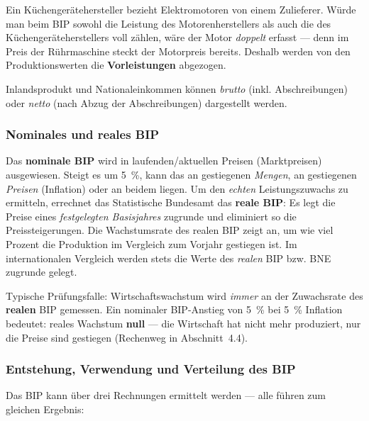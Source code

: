 \documentclass[11pt, a4paper]{article}
\begin{document}
\begin{beispiel}
Ein Küchengerätehersteller bezieht Elektromotoren von einem Zulieferer. Würde man beim
BIP sowohl die Leistung des Motorenherstellers als auch die des Küchengeräteherstellers
voll zählen, wäre der Motor \emph{doppelt} erfasst --- denn im Preis der Rührmaschine
steckt der Motorpreis bereits. Deshalb werden von den Produktionswerten die
\textbf{Vorleistungen} abgezogen.
\end{beispiel}

Inlandsprodukt und Nationaleinkommen können \emph{brutto} (inkl. Abschreibungen) oder
\emph{netto} (nach Abzug der Abschreibungen) dargestellt werden.

\subsubsection{Nominales und reales BIP}

Das \textbf{nominale BIP} wird in laufenden/aktuellen Preisen (Marktpreisen) ausgewiesen.
Steigt es um 5~\%, kann das an gestiegenen \emph{Mengen}, an gestiegenen \emph{Preisen}
(Inflation) oder an beidem liegen. Um den \emph{echten} Leistungszuwachs zu ermitteln,
errechnet das Statistische Bundesamt das \textbf{reale BIP}: Es legt die Preise eines
\emph{festgelegten Basisjahres} zugrunde und eliminiert so die Preissteigerungen. Die
Wachstumsrate des realen BIP zeigt an, um wie viel Prozent die Produktion im Vergleich
zum Vorjahr gestiegen ist. Im internationalen Vergleich werden stets die Werte des
\emph{realen} BIP bzw. BNE zugrunde gelegt.

\begin{achtung}
Typische Prüfungsfalle: Wirtschaftswachstum wird \emph{immer} an der Zuwachsrate des
\textbf{realen} BIP gemessen. Ein nominaler BIP-Anstieg von 5~\% bei 5~\% Inflation
bedeutet: reales Wachstum \textbf{null} --- die Wirtschaft hat nicht mehr produziert,
nur die Preise sind gestiegen (Rechenweg in Abschnitt~4.4).
\end{achtung}

\subsubsection{Entstehung, Verwendung und Verteilung des BIP}

Das BIP kann über drei Rechnungen ermittelt werden --- alle führen zum gleichen Ergebnis:
\end{document}
